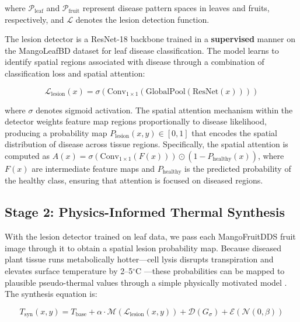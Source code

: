 \documentclass[utf8]{FrontiersinHarvard} %
\begin{document}
where $\mathcal{P}_{\text{leaf}}$ and $\mathcal{P}_{\text{fruit}}$ represent disease pattern spaces in leaves and fruits, respectively, and $\mathcal{L}$ denotes the lesion detection function.

The lesion detector is a ResNet-18 \cite{he2016} backbone trained in a \textbf{supervised} manner on the MangoLeafBD dataset for leaf disease classification. The model learns to identify spatial regions associated with disease through a combination of classification loss and spatial attention:

\begin{equation}
    \mathcal{L}_{\text{lesion}}(x) = \sigma(\text{Conv}_{1\times 1}(\text{GlobalPool}(\text{ResNet}(x))))
    \label{eq:lesion_detector}
\end{equation}

where $\sigma$ denotes sigmoid activation. The spatial attention mechanism within the detector weights feature map regions proportionally to disease likelihood, producing a probability map $P_{\text{lesion}}(x, y) \in [0, 1]$ that encodes the spatial distribution of disease across tissue regions. Specifically, the spatial attention is computed as $A(x) = \sigma(\text{Conv}_{1 \times 1}(F(x))) \odot (1 - P_{\text{healthy}}(x))$, where $F(x)$ are intermediate feature maps and $P_{\text{healthy}}$ is the predicted probability of the healthy class, ensuring that attention is focused on diseased regions.
\begingroup\color{blue}
\subsection{Stage 2: Physics-Informed Thermal Synthesis}
With the lesion detector trained on leaf data, we pass each MangoFruitDDS fruit image through it to obtain a spatial lesion probability map. Because diseased plant tissue runs metabolically hotter---cell lysis disrupts transpiration and elevates surface temperature by 2--5$^{\circ}$C \cite{mahlein2016,pineda2021}---these probabilities can be mapped to plausible pseudo-thermal values through a simple physically motivated model \cite{raissi2019,karniadakis2021}. The synthesis equation is:
\endgroup

\begin{equation}
    T_{\text{syn}}(x,y) = T_{\text{base}} + \alpha \cdot \mathcal{M}(\mathcal{L}_{\text{lesion}}(x,y)) + \mathcal{D}(G_{\sigma}) + \mathcal{E}(\mathcal{N}(0,\beta))
    \label{eq:thermal_synthesis}
\end{equation}
\end{document}
